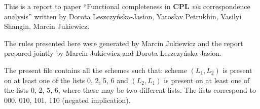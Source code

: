 \documentclass[11pt]{article}
\begin{document}
	
	This is a report to paper ``Functional completeness in \textbf{CPL} \textit{via} correspondence analysis'' written by Dorota Leszczy\'{n}ska-Jasion, 
	Yaroslav Petrukhin, Vasilyi Shangin, Marcin Jukiewicz. 
	
	The rules presented here were generated by Marcin Jukiewicz and the report prepared jointly by Marcin Jukiewicz and Dorota Leszczy\'{n}ska-Jasion.
	
	The present file contains all the schemes such that: scheme $(L_1, L_2)$ is present on at least one of the lists 0, 2, 5, 6 and $(L_2, L_1)$ is present on at least one of the lists 0, 2, 5, 6, where these may be two different lists. The lists correspond to 000, 010, 101, 110 (negated implication).
	
	\bigskip
	
\begin{center}


\end{center}
\end{document}
